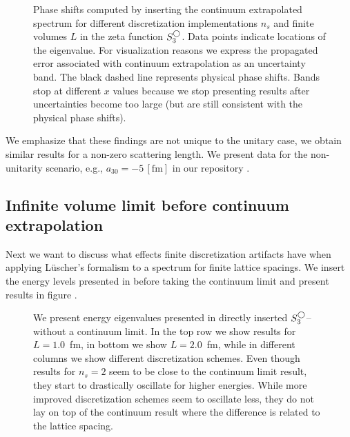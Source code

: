 \begin{figure}[H]
	\centering
    \scalebox{1.0}{}
    \caption{
        \label{fig:continuum-extrapolation-ere}
        Phase shifts computed by inserting the continuum extrapolated spectrum for different discretization implementations $n_s$ and finite volumes $L$ in the zeta function $S^{\bigcirc}_3$.
        Data points indicate locations of the eigenvalue.
        For visualization reasons we express the propagated error associated with continuum extrapolation as an uncertainty band.
        The black dashed line represents physical phase shifts.
        Bands stop at different $x$ values because we stop presenting results after uncertainties become too large (but are still consistent with the physical phase shifts).
        }
\end{figure}


We emphasize that these findings are not unique to the unitary case, we obtain similar results for a non-zero scattering length.
We present data for the non-unitarity scenario, e.g., $a_{30} = - 5 \, [\mathrm{fm}]$ in our repository \cite{luescher-nd_201}.

\subsection{Infinite volume limit before continuum extrapolation}
Next we want to discuss what effects finite discretization artifacts have when applying L\"uscher's formalism to a spectrum for finite lattice spacings.
We insert the energy levels presented in  before taking the continuum limit and present results in figure .

\begin{figure}[th]
	\centering
    \scalebox{0.9}{}
    \caption{
        \label{fig:unimproved spherical}
        We present energy eigenvalues presented in  directly inserted $S^{\bigcirc}_3$--without a continuum limit.
        In the top row we show results for $L=1.0$~fm, in bottom we show $L=2.0$~fm, while in different columns we show different discretization schemes.
        Even though results for $n_s = 2$ seem to be close to the continuum limit result, they start to drastically oscillate for higher energies.
        While more improved discretization schemes seem to oscillate less, they do not lay on top of the continuum result where the difference is related to the lattice spacing.
    }
\end{figure}

